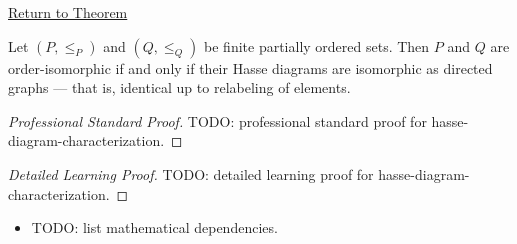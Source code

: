 \newpage
{}
\label{prf:hasse-diagram-characterization}

\begin{remark*}[Return]
\hyperref[prop:hasse-diagram-characterization]{Return to Theorem}
\end{remark*}

\begin{proposition*}
Let $(P, \leq_P)$ and $(Q, \leq_Q)$ be finite partially ordered sets.
Then $P$ and $Q$ are order-isomorphic if and only if their Hasse diagrams
are isomorphic as directed graphs --- that is, identical up to relabeling
of elements.
\end{proposition*}

\begin{proof}[Professional Standard Proof]
\LRAProofBodyStart
TODO: professional standard proof for hasse-diagram-characterization.
\end{proof}

\begin{proof}[Detailed Learning Proof]
\LRAProofBodyStart
TODO: detailed learning proof for hasse-diagram-characterization.
\end{proof}

\begin{remark*}
\end{remark*}

\begin{dependencies}
\begin{itemize}
  \item TODO: list mathematical dependencies.
\end{itemize}
\end{dependencies}

\clearpage
